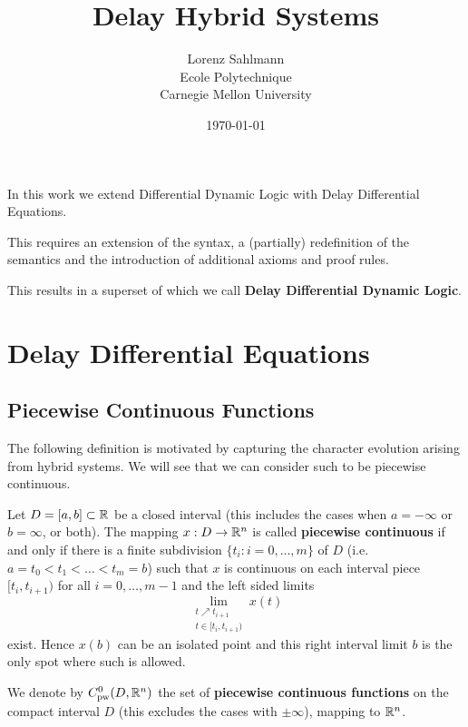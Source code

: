 \documentclass[10pt]{article}
\begin{document}
\title{Delay Hybrid Systems}

\author{Lorenz Sahlmann\\ Ecole Polytechnique\\ Carnegie Mellon University}
\date{\today}

\maketitle


In this work we extend Differential Dynamic Logic with Delay Differential Equations.

This requires an extension of the syntax, a (partially) redefinition of the semantics and the introduction of additional axioms and proof rules.

This results in a superset of \dL which we call \textbf{Delay Differential Dynamic Logic}.

\section{Delay Differential Equations} \label{sec:delay-differential-equations}

\subsection{Piecewise Continuous Functions} \label{sec:piecewise-continuous-functions}
The following definition is motivated by capturing the character evolution arising from hybrid systems. We will see that we can consider such to be piecewise continuous.

\begin{definition}
    \label{definition-piecewise-continuous}

    Let $D=[a,b]\subset\mathbb{R}$ be a closed interval (this includes the cases when $a=-\infty$ or $b=\infty$, or both). The mapping $x:D\rightarrow\mathbb{R}^n$ is called \textbf{piecewise continuous} if and only if there is a finite subdivision $\{t_i:i=0,\ldots,m\}$ of $D$ (i.e.\ $a=t_0<t_1<\ldots<t_m=b$) such that $x$ is continuous on each interval piece $[t_i,t_{i+1})$ for all $i=0,\ldots,m-1$ and the left sided limits
    \begin{equation}
        \lim_{\substack{t\nearrow t_{i+1}\\ t\in[t_i,t_{i+1})}} x(t)
    \end{equation}
    exist. Hence $x(b)$ can be an isolated point and this right interval limit $b$ is the only spot where such is allowed.

    We denote by $C^0_\text{pw}(D,\mathbb{R}^n)$ the set of \textbf{piecewise continuous functions} on the compact interval $D$ (this excludes the cases with $\pm\infty$), mapping to $\mathbb{R}^n$.

\end{definition}
\end{document}
